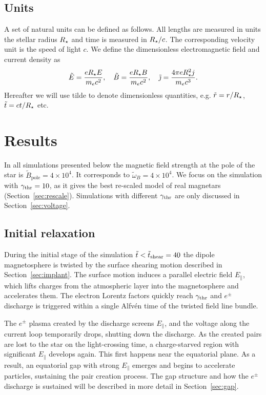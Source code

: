\subsection{Units}
\label{sec:units}

A set of natural units can be defined as follows.
All lengths are measured in units the stellar radius $R_\star$ and time
is measured in $R_\star/c$. The corresponding velocity unit is the speed of light $c$.
We define the dimensionless electromagnetic field and current density as
\begin{equation}
  \label{eq:dimensionless}
  \tilde{E} = \frac{eR_\star E}{m_ec^2},\quad \tilde{B}
    = \frac{eR_\star B}{m_ec^2},\quad \tilde{\jmath} = \frac{4\pi eR_\star^2j}{m_ec^3}.
\end{equation}
Hereafter we will use tilde to denote dimensionless quantities,
e.g. $\tilde r=r/R_\star$, $\tilde{t}=ct/R_\star$ etc.



\section{Results}
\label{sec:result}


In all simulations presented below the magnetic field strength at the pole of
the star is $\tilde{B}_\mathrm{pole} = 4\times 10^{4}$. It corresponds to
$\tilde{\omega}_B=4\times 10^4$. We focus on the simulation with $\gamma_{\rm thr}=10$, as it
gives the best re-scaled model of real magnetars (Section~\ref{sec:rescale}). Simulations with
different $\gamma_{\rm thr}$ are only discussed in Section~\ref{sec:voltage}.


\subsection{Initial relaxation}


During the initial stage of the simulation $\tilde{t}<\tilde{t}_{\rm shear}=40$
the dipole magnetosphere is twisted by the surface shearing motion described in
Section~\ref{sec:implant}. The surface motion induces a parallel electric field
$E_{\parallel}$, which lifts charges from the atmospheric layer into the
magnetosphere and accelerates them. The electron Lorentz factors quickly reach
$\gamma_{\rm thr}$ and $e^{\pm}$ discharge is triggered within a single Alfv\'en time of
the twisted field line bundle.

The $e^\pm$ plasma created by the discharge screens $E_\parallel$, and the voltage
along the current loop temporarily drops, shutting down the discharge.
As  the created pairs are lost to the star on the light-crossing time,
a charge-starved region with significant $E_\parallel$ develops again.
This first happens near the equatorial plane.
As a result, an equatorial gap with strong $E_\parallel$ emerges and begins to
accelerate particles, sustaining the pair creation process. The gap structure and how
the $e^\pm$ discharge is sustained will be described in more detail in Section~\ref{sec:gap}.

